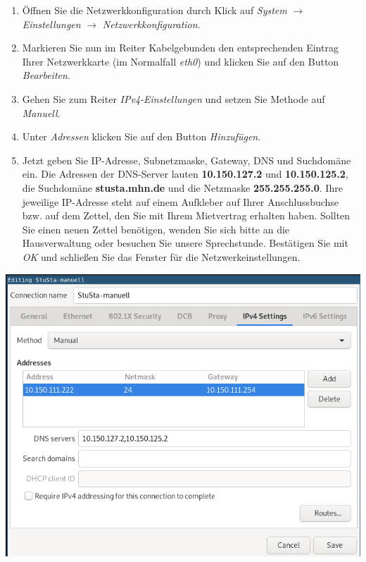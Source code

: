 \documentclass[a4paper,12pt]{scrartcl}
\begin{document}
\begin{minipage}{0.6\textwidth}
\begin{enumerate}
	\item Öffnen Sie die Netzwerkkonfiguration durch Klick auf \emph{System} $\rightarrow$ \emph{Einstellungen} $\rightarrow$ \emph{Netzwerkkonfiguration}.
	\item Markieren Sie nun im Reiter Kabelgebunden den entsprechenden Eintrag Ihrer Netzwerkkarte (im Normalfall \emph{eth0}) und klicken Sie auf den Button \emph{Bearbeiten}.
	\item Gehen Sie zum Reiter \emph{IPv4-Einstellungen} und setzen Sie Methode auf \emph{Manuell}.
	\item Unter \emph{Adressen} klicken Sie auf den Button \emph{Hinzufügen}.
	\item Jetzt geben Sie IP-Adresse, Subnetzmaske, Gateway, DNS und Suchdomäne ein. Die Adressen der DNS-Server lauten \textbf{10.150.127.2} und \textbf{10.150.125.2}, die Suchdomäne \textbf{stusta.mhn.de} und die Netzmaske \textbf{255.255.255.0}. Ihre jeweilige IP-Adresse steht auf einem Aufkleber auf Ihrer Anschlussbuchse bzw. auf dem Zettel, den Sie mit Ihrem Mietvertrag erhalten haben. Sollten Sie einen neuen Zettel benötigen, wenden Sie sich bitte an die Hausverwaltung oder besuchen Sie unsere Sprechstunde. Bestätigen Sie mit \emph{OK} und schließen Sie das Fenster für die Netzwerkeinstellungen.
\end{enumerate}
\end{minipage}
\begin{minipage}{0.4\textwidth}
\includegraphics[width=\linewidth]{Bilder/IP_Ubuntu_neu}
\end{minipage}
\end{document}

